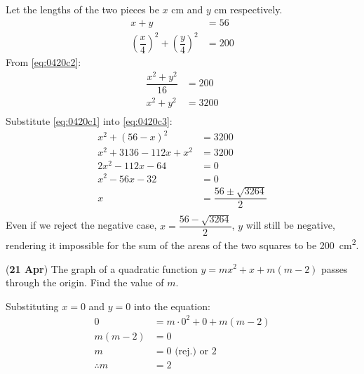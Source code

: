 \documentclass[12pt, answers]{exam}
\renewcommand{\frac}[2]{\dfrac{#1}{#2}}
\begin{document}
\begin{questions}
\begin{parts}
\begin{solution}
			Let the lengths of the two pieces be \(x\) \si{\centi\metre} and \(y\) \si{\centi\metre} respectively.
			\begin{align}
				x + y                                                          & = 56 \label{eq:0420c1} \tag{1}  \\
				{\left(\frac{x}{4}\right)}^{2}+ {\left(\frac{y}{4}\right)}^{2} & = 200 \label{eq:0420c2} \tag{2}
			\end{align}
			From \eqref{eq:0420c2}:
			\begin{align*}
				\frac{x^{2} + y^{2}}{16} & = 200                            \\
				x^{2} + y^{2}            & = 3200 \label{eq:0420c3} \tag{3} \\
			\end{align*}
			Substitute \eqref{eq:0420c1} into \eqref{eq:0420c3}:
			\begin{align*}
				x^{2} + (56 - x)^{2}        & = 3200                         \\
				x^{2} + 3136 - 112x + x^{2} & = 3200                         \\
				2x^{2}  - 112x - 64         & = 0                            \\
				x^{2}  - 56x -32            & = 0                            \\
				x                           & = \frac{56 \pm \sqrt{3264}}{2} \\
			\end{align*}
			Even if we reject the negative case, \(x = \frac{56 - \sqrt{3264}}2\),
			\(y\) will still be negative,
			rendering it impossible for the sum of the areas of the two squares to be \qty{200}{\square\centi\metre}.
		\end{solution}
	\end{parts}

	\question (\textbf{21 Apr}) The graph of a quadratic function
	\(y = mx^2 + x + m(m - 2)\) passes through the origin. Find the value of \(m\).
	\begin{solution}
		Substituting \(x = 0\) and \(y = 0\) into the equation:
		\begin{align*}
			0            & = m \cdot 0^{2} + 0 + m(m - 2) \\
			m(m - 2)     & = 0                            \\
			m            & = 0 \text{ (rej.) or } 2       \\
			\therefore m & = 2
		\end{align*}
	\end{solution}


\end{questions}
\end{document}
